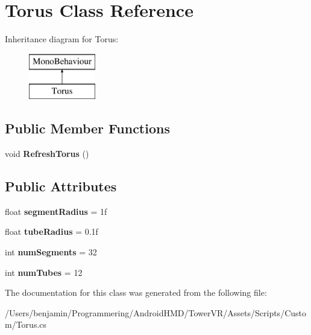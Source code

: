 \hypertarget{class_torus}{}\section{Torus Class Reference}
\label{class_torus}
Inheritance diagram for Torus\+:\begin{figure}[H]
\begin{center}
\leavevmode
\includegraphics[height=2.000000cm]{class_torus}
\end{center}
\end{figure}
\subsection*{Public Member Functions}
\begin{DoxyCompactItemize}
\item 
void {\bfseries Refresh\+Torus} ()\hypertarget{class_torus_a11488676c74af823a124085c3af72aa3}{}\label{class_torus_a11488676c74af823a124085c3af72aa3}

\end{DoxyCompactItemize}
\subsection*{Public Attributes}
\begin{DoxyCompactItemize}
\item 
float {\bfseries segment\+Radius} = 1f\hypertarget{class_torus_a8dd1e53cd1fb9415fbe64b7004ba274c}{}\label{class_torus_a8dd1e53cd1fb9415fbe64b7004ba274c}

\item 
float {\bfseries tube\+Radius} = 0.\+1f\hypertarget{class_torus_af176474a9c7b704f10c2fd58b33771f8}{}\label{class_torus_af176474a9c7b704f10c2fd58b33771f8}

\item 
int {\bfseries num\+Segments} = 32\hypertarget{class_torus_a5c0c35544de72aa99edaa76d5b7357d8}{}\label{class_torus_a5c0c35544de72aa99edaa76d5b7357d8}

\item 
int {\bfseries num\+Tubes} = 12\hypertarget{class_torus_a7f981e7fbdfedb7170aba45013673dff}{}\label{class_torus_a7f981e7fbdfedb7170aba45013673dff}

\end{DoxyCompactItemize}


The documentation for this class was generated from the following file\+:\begin{DoxyCompactItemize}
\item 
/\+Users/benjamin/\+Programmering/\+Android\+H\+M\+D/\+Tower\+V\+R/\+Assets/\+Scripts/\+Custom/Torus.\+cs\end{DoxyCompactItemize}
